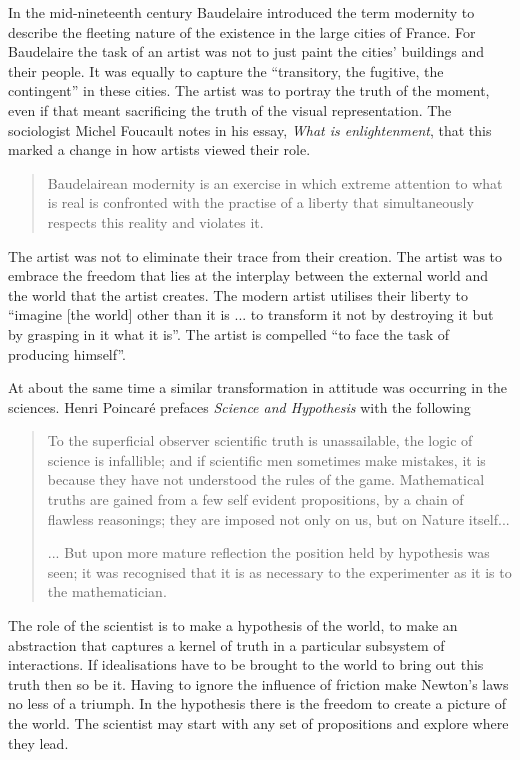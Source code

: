 In the mid-nineteenth century Baudelaire introduced the term modernity 
to describe the fleeting nature of the existence in the large cities of France.
For Baudelaire the task of an artist was not to just paint the cities' buildings and their people.  
It was equally to capture the ``transitory, the fugitive, the contingent''\cite{BoudelairePainterofModernLife} in these cities.
The artist was to portray the truth of the moment, even if that meant sacrificing the truth of the visual representation.
The sociologist Michel Foucault notes in his essay, {\em What is enlightenment}\cite{FoucaultWhatIsEnlightenment}, that this marked a change in how artists viewed their role.
\begin{quote}
  Baudelairean modernity is an exercise in which extreme attention to
  what is real is confronted with the practise of a liberty that
  simultaneously respects this reality and violates it.
\end{quote}
The artist was not to eliminate their trace from their creation.  
The artist was to embrace the freedom
that lies at the interplay between the external world  and the world
that the artist creates.  The modern artist utilises their liberty to ``imagine 
[the world] other than it is ... to transform it not by destroying it but by grasping in it
what it is''. 
The artist is compelled ``to face the task of producing himself''.


At about the same time a similar transformation in attitude was occurring in the sciences.
Henri Poincar{\'e} prefaces {\em Science and Hypothesis}\cite*{Poincare1902} with the following 
\begin{quote}
 To the superficial observer scientific truth is unassailable,
 the logic of science is infallible;
 and if scientific men sometimes make mistakes,
 it is because they have not understood the rules of the game.
 Mathematical truths are gained from a few self evident propositions,
 by a chain of flawless reasonings; they are imposed not only on us, but on Nature itself...

 ... But upon more mature reflection the position held by hypothesis was seen; it was recognised that it is as necessary to the experimenter as it is to the mathematician.
\end{quote}
The role of the scientist is to make a hypothesis of the world, to make an abstraction that captures a kernel of truth in a particular subsystem of interactions.
If idealisations have to be brought to the world to bring out this truth then so be it.
Having to ignore the influence of friction make Newton's laws no less of a triumph.
In the hypothesis there is the freedom to create a picture of the world.
The scientist may start with any set of propositions and explore where they lead.


